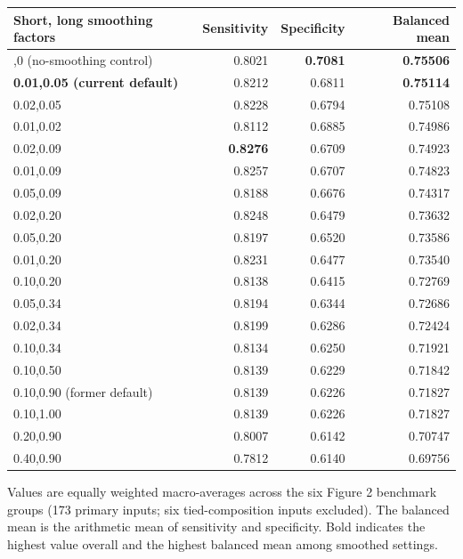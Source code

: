 \documentclass[ASNA]{latex/wiley/USG}
\newcounter{none}
\begin{document}
\begingroup
\small
\setlength{\tabcolsep}{4pt}
\renewcommand{\arraystretch}{1.14}

\captionsetup{type=table}
\begingroup
\renewcommand{\thetable}{S4}
\endgroup

{\def\LTcaptype{none} %
\begin{longtable}[]{@{}lrrr@{}}
\toprule\noalign{}
Short, long smoothing factors & Sensitivity & Specificity & Balanced
mean \\
\midrule\noalign{}
\endhead
\bottomrule\noalign{}
\endlastfoot
0,0 (no-smoothing control) & 0.8021 & \textbf{0.7081} &
\textbf{0.75506} \\
\textbf{0.01,0.05 (current default)} & 0.8212 & 0.6811 &
\textbf{0.75114} \\
0.02,0.05 & 0.8228 & 0.6794 & 0.75108 \\
0.01,0.02 & 0.8112 & 0.6885 & 0.74986 \\
0.02,0.09 & \textbf{0.8276} & 0.6709 & 0.74923 \\
0.01,0.09 & 0.8257 & 0.6707 & 0.74823 \\
0.05,0.09 & 0.8188 & 0.6676 & 0.74317 \\
0.02,0.20 & 0.8248 & 0.6479 & 0.73632 \\
0.05,0.20 & 0.8197 & 0.6520 & 0.73586 \\
0.01,0.20 & 0.8231 & 0.6477 & 0.73540 \\
0.10,0.20 & 0.8138 & 0.6415 & 0.72769 \\
0.05,0.34 & 0.8194 & 0.6344 & 0.72686 \\
0.02,0.34 & 0.8199 & 0.6286 & 0.72424 \\
0.10,0.34 & 0.8134 & 0.6250 & 0.71921 \\
0.10,0.50 & 0.8139 & 0.6229 & 0.71842 \\
0.10,0.90 (former default) & 0.8139 & 0.6226 & 0.71827 \\
0.10,1.00 & 0.8139 & 0.6226 & 0.71827 \\
0.20,0.90 & 0.8007 & 0.6142 & 0.70747 \\
0.40,0.90 & 0.7812 & 0.6140 & 0.69756 \\
\end{longtable}
}

\endgroup

Values are equally weighted macro-averages across the six Figure 2
benchmark groups (173 primary inputs; six tied-composition inputs
excluded). The balanced mean is the arithmetic mean of sensitivity and
specificity. Bold indicates the highest value overall and the highest
balanced mean among smoothed settings.
\end{document}
